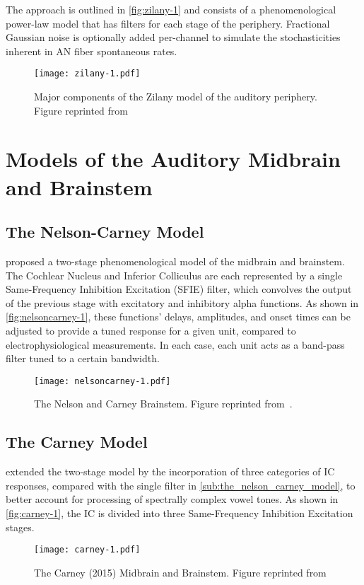 The approach is outlined in \autoref{fig:zilany-1} and consists of a phenomenological power-law model that has filters for each stage of the periphery.  Fractional Gaussian noise is optionally added per-channel to simulate the stochasticities inherent in AN fiber spontaneous rates. 

\begin{figure}[htbp]
	\centering
	\texttt{[image: zilany-1.pdf]}
	\caption[The Zilany Model]{Major components of the Zilany model of the auditory periphery.  Figure reprinted from~\cite{Zilany2009Phenomenological}}
	\label{fig:zilany-1}
\end{figure}
\section{Models of the Auditory Midbrain and Brainstem} %
\label{sec:models_of_the_auditory_midbrain_and_brainstem}
\subsection{The Nelson-Carney Model} %
\label{sub:the_nelson_carney_model}
\cite{Nelson2004Phenomenological} proposed a two-stage phenomenological model of the midbrain and brainstem.  The Cochlear Nucleus and Inferior Colliculus are each represented by a single Same-Frequency Inhibition Excitation (SFIE) filter, which convolves the output of the previous stage with  excitatory and inhibitory alpha functions.  As shown in \autoref{fig:nelsoncarney-1}, these functions' delays, amplitudes, and onset times can be adjusted to provide a tuned response for a given unit, compared to electrophysiological measurements.  In each case, each unit acts as a band-pass filter tuned to a certain bandwidth. 
\begin{figure}[htbp]
	\centering
	\texttt{[image: nelsoncarney-1.pdf]}
	\caption[The Nelson and Carney Model]{The Nelson and Carney Brainstem. Figure reprinted from~\cite{Nelson2004Phenomenological}.}
	\label{fig:nelsoncarney-1}
\end{figure}

\subsection{The Carney Model} %
\label{sub:the_carney_model}
\cite{Carney2015Speech} extended the two-stage \citeauthor{Nelson2004Phenomenological} model by the incorporation of three categories of IC responses, compared with the single filter in \autoref{sub:the_nelson_carney_model}, to better account for processing of spectrally complex vowel tones.  As shown in \autoref{fig:carney-1}, the IC is divided into three Same-Frequency Inhibition Excitation stages. 
\begin{figure}[htbp]
	\centering
	\texttt{[image: carney-1.pdf]}
	\caption[The Carney 2015 Model]{The Carney (2015) Midbrain and Brainstem.  Figure reprinted from~\cite{Carney2015Speech}}
	\label{fig:carney-1}
\end{figure}


